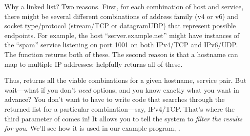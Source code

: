 Why a linked list?  Two reasons.  First, for each combination of
host and service, there might be several different combinations of
address family (v4 or v6) and socket type/protocol (stream/TCP or
datagramUDP) that represent possible endpoints.  For example, the host
``server.example.net'' might have instances of the ``spam'' service
listening on port 1001 on both IPv4/TCP and IPv6/UDP.  The 
function returns both of these.  The second reason is that
a hostname can map to multiple IP addresses; 
helpfully returns all of these.

Thus,  returns all the viable combinations for a given
hostname, service pair.
But wait---what if you don't \emph{need} options,
and you know exactly what you want in advance?
You don't want to have to write code that searches through the
returned list for a particular combination---say, IPv4/TCP.
That's where the third parameter of
 comes in!  It allows you to tell the system to
\emph{filter the results for you}.  We'll see how it is used in
our example program, .


